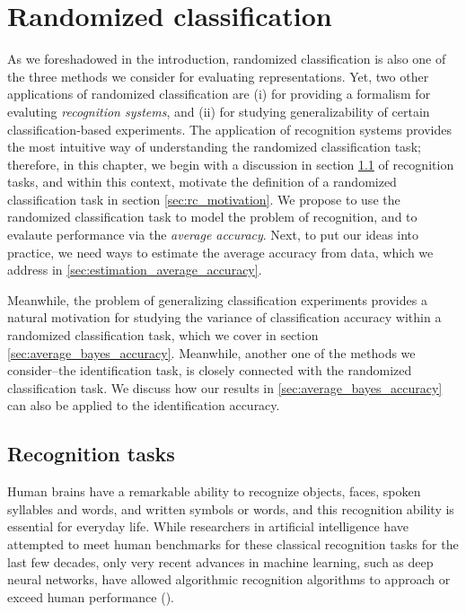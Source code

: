 
\chapter{Randomized classification} %

\label{Chapter2} %

As we foreshadowed in the introduction, randomized classification is
also one of the three methods we consider for evaluating
representations.  Yet, two other applications of randomized
classification are (i) for providing a formalism for evaluting
\emph{recognition systems}, and (ii) for studying generalizability of
certain classification-based experiments.  The application of
recognition systems provides the most intuitive way of understanding
the randomized classification task; therefore, in this chapter, we
begin with a discussion in section \ref{sec:recog_tasks} of
recognition tasks, and within this context, motivate the definition of
a randomized classification task in section \ref{sec:rc_motivation}.
We propose to use the randomized classification task to model the
problem of recognition, and to evalaute performance via the
\emph{average accuracy}.  Next, to put our ideas into practice, we
need ways to estimate the average accuracy from data, which we address
in \ref{sec:estimation_average_accuracy}.

Meanwhile, the problem of generalizing classification experiments
provides a natural motivation for studying the variance of
classification accuracy within a randomized classification task, which
we cover in section \ref{sec:average_bayes_accuracy}.  Meanwhile,
another one of the methods we consider--the identification task, is
closely connected with the randomized classification task.  We discuss
how our results in \ref{sec:average_bayes_accuracy} can also be
applied to the identification accuracy.

\section{Recognition tasks}\label{sec:recog_tasks}

Human brains have a remarkable ability to recognize objects, faces,
spoken syllables and words, and written symbols or words, and this
recognition ability is essential for everyday life.  While researchers
in artificial intelligence have attempted to meet human benchmarks for
these classical recognition tasks for the last few decades, only very
recent advances in machine learning, such as deep neural networks,
have allowed algorithmic recognition algorithms to approach or exceed
human performance (\cite{lecun2015deep}).

